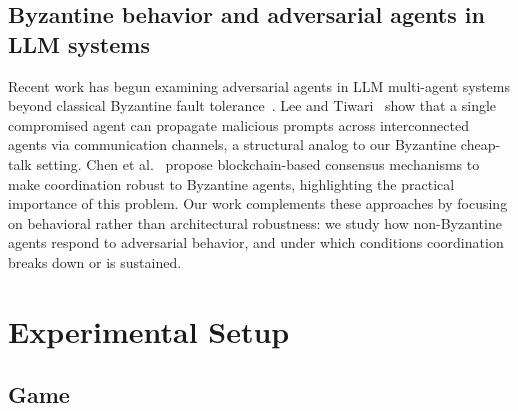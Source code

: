 \documentclass[runningheads]{llncs}
\begin{document}

\subsection{Byzantine behavior and adversarial agents in LLM systems}
Recent work has begun examining adversarial agents in LLM multi-agent systems beyond classical Byzantine fault tolerance~\cite{lamport1982byzantine}. Lee and Tiwari~\cite{lee2024prompt} show that a single compromised agent can propagate malicious prompts across interconnected agents via communication channels, a structural analog to our Byzantine cheap-talk setting. Chen et al.~\cite{chen2024blockagents} propose blockchain-based consensus mechanisms to make coordination robust to Byzantine agents, highlighting the practical importance of this problem. Our work complements these approaches by focusing on behavioral rather than architectural robustness: we study how non-Byzantine agents respond to adversarial behavior, and under which conditions coordination breaks down or is sustained.





\section{Experimental Setup}\label{sec:setup}

\subsection{Game}
\end{document}
